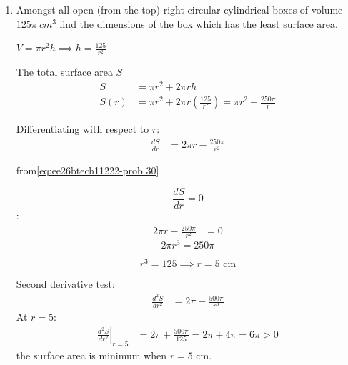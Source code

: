 \begin{enumerate}[label=\thesubsection.\arabic*, ref=\thesubsection.\theenumi]
\begin{center}
    or 
\end{center}
\textbf{question :}

If $y=e^{a~cos^{-1}x},-1<x<1$, then show that $(1-x^{2})\frac{d^{2}y}{dx^{2}}-x\frac{dy}{dx}-a^{2}y=0$

\solution

$\frac{dy}{dx}=-e^{a cos^{-1}x}a(\frac{1}{\sqrt{1-x^2}}) $$\frac{dy}{dx}= \frac{-ay}{\sqrt{1-x^2}} \implies \sqrt{1-x^2}\frac{dy}{dx}= -ay$

$$(1-x^2)(\frac{dy}{dx})^2=a^2y^2$$  $$2\frac{d^2y}{dx^2}(\frac{-ay}{\sqrt{1-x^2}})(1-x^2)-2x\frac{a^2y^2}{1-x^2}= 2a^2y(\frac{-ay}{\sqrt{1-x^2}}) $$

$$(1-x^{2})\frac{d^{2}y}{dx^{2}}-x\frac{dy}{dx}-a^{2}y=0$$

\item 

Amongst all open (from the top) right circular cylindrical boxes of volume $125\pi~cm^{3}$ find the dimensions of the box which has the least surface area.  

\solution

$V=\pi r^2h \implies h= \frac{125}{r^2}$

The total surface area $S$
\begin{align}
S &= \pi r^2 + 2\pi r h \\
S(r) &= \pi r^2 + 2\pi r \left(\frac{125}{r^2}\right) = \pi r^2 + \frac{250\pi}{r}
\end{align}

Differentiating with respect to $r$:
\begin{align}
\frac{dS}{dr} &= 2\pi r - \frac{250\pi}{r^2}
\end{align}

from\eqref{eq:ee26btech11222-prob 30}

$$\frac{dS}{dr} = 0$$:
\begin{align}
2\pi r - \frac{250\pi}{r^2} &= 0 
\end{align}
$$2\pi r^3 = 250\pi$$ 

$$r^3 = 125 \implies r = 5\text{ cm}$$

Second derivative test:
\begin{align}
\frac{d^2S}{dr^2} &= 2\pi + \frac{500\pi}{r^3}
\end{align}
At $r = 5$:
\begin{align}
\left.\frac{d^2S}{dr^2}\right|_{r=5} &= 2\pi + \frac{500\pi}{125} = 2\pi + 4\pi = 6\pi > 0
\end{align}
the surface area is minimum when $r = 5\text{ cm}$.


\end{enumerate}
